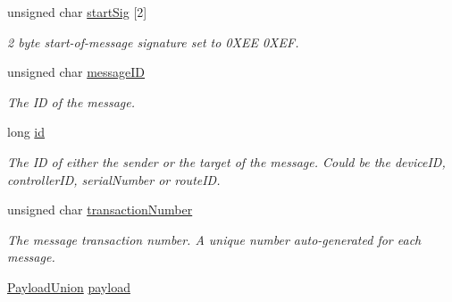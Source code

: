\begin{DoxyCompactItemize}
\item 
\mbox{\label{struct_u_d_p_message_struct_a40c0afec4be20d7cfaac97b3ec90cb56}} 
unsigned char \hyperlink{struct_u_d_p_message_struct_a40c0afec4be20d7cfaac97b3ec90cb56}{start\+Sig} \mbox{[}2\mbox{]}
\begin{DoxyCompactList}\small\item\em 2 byte start-\/of-\/message signature set to 0\+X\+EE 0\+X\+EF. \end{DoxyCompactList}\item 
\mbox{\label{struct_u_d_p_message_struct_a5b9f258b174a6d6a738baa8033243573}} 
unsigned char \hyperlink{struct_u_d_p_message_struct_a5b9f258b174a6d6a738baa8033243573}{message\+ID}
\begin{DoxyCompactList}\small\item\em The ID of the message. \end{DoxyCompactList}\item 
\mbox{\label{struct_u_d_p_message_struct_a363553f26a5a6b317dc5b0b4c227f966}} 
long \hyperlink{struct_u_d_p_message_struct_a363553f26a5a6b317dc5b0b4c227f966}{id}
\begin{DoxyCompactList}\small\item\em The ID of either the sender or the target of the message. Could be the device\+ID, controller\+ID, serial\+Number or route\+ID. \end{DoxyCompactList}\item 
\mbox{\label{struct_u_d_p_message_struct_a98ed3cc3a244ee9637f6b85fcf6165b8}} 
unsigned char \hyperlink{struct_u_d_p_message_struct_a98ed3cc3a244ee9637f6b85fcf6165b8}{transaction\+Number}
\begin{DoxyCompactList}\small\item\em The message transaction number. A unique number auto-\/generated for each message. \end{DoxyCompactList}\item 
\mbox{\label{struct_u_d_p_message_struct_a4c0b3a3b4ea7e571309e537eec0ebfd1}} 
\hyperlink{union_payload_union}{Payload\+Union} \hyperlink{struct_u_d_p_message_struct_a4c0b3a3b4ea7e571309e537eec0ebfd1}{payload}

\end{DoxyCompactItemize}
